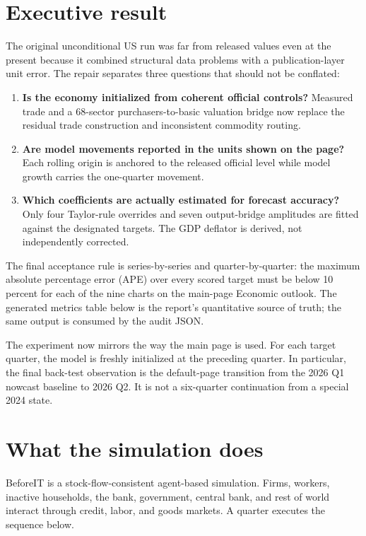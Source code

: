 \documentclass[10pt]{article}
\begin{document}
\section{Executive result}

The original unconditional US run was far from released values even at the
present because it combined structural data problems with a publication-layer
unit error. The repair separates three questions that should not be conflated:

\begin{enumerate}
\item \textbf{Is the economy initialized from coherent official controls?}
Measured trade and a 68-sector purchasers-to-basic valuation bridge now replace
the residual trade construction and inconsistent commodity routing.
\item \textbf{Are model movements reported in the units shown on the page?}
Each rolling origin is anchored to the released official level while model
growth carries the one-quarter movement.
\item \textbf{Which coefficients are actually estimated for forecast accuracy?}
Only four Taylor-rule overrides and seven output-bridge amplitudes are fitted
against the designated targets. The GDP deflator is derived, not independently
corrected.
\end{enumerate}

\begin{resultbox}
The final acceptance rule is series-by-series and quarter-by-quarter:
the maximum absolute percentage error (APE) over every scored target must be
below 10 percent for each of the nine charts on the main-page Economic outlook.
The generated metrics table below is the report's quantitative source of truth;
the same output is consumed by the audit JSON.
\end{resultbox}

The experiment now mirrors the way the main page is used. For each target
quarter, the model is freshly initialized at the preceding quarter. In
particular, the final back-test observation is the default-page transition from
the 2026 Q1 nowcast baseline to 2026 Q2. It is not a six-quarter continuation
from a special 2024 state.

\section{What the simulation does}

BeforeIT is a stock-flow-consistent agent-based simulation. Firms, workers,
inactive households, the bank, government, central bank, and rest of world
interact through credit, labor, and goods markets. A quarter executes the
sequence below.
\end{document}
